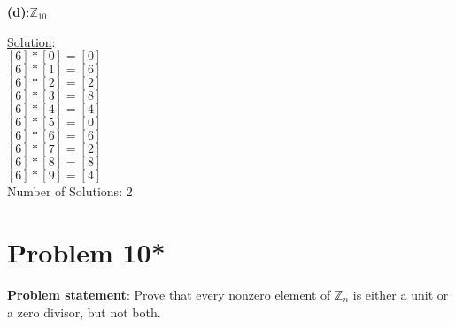 \documentclass{article} %
\begin{document}
\begin{addmargin}[1em]{0em}
\newpage
\textbf{(d)}:$\mathbb{Z}_{10}$
\begin{addmargin}[1em]{0em}
\underline{Solution}: \\
$[6] * [0] = [0]$ \\
$[6] * [1] = [6]$ \\
$[6] * [2] = [2]$ \\
$[6] * [3] = [8]$ \\
$[6] * [4] = [4]$ \\
$[6] * [5] = [0]$ \\
$[6] * [6] = [6]$ \\
$[6] * [7] = [2]$ \\
$[6] * [8] = [8]$ \\
$[6] * [9] = [4]$ \\
Number of Solutions: 2
\begin{addmargin}[1em]{0em}
\end{addmargin}
\end{addmargin}
\end{addmargin}

\newpage

\section*{Problem 10*}

\textbf{Problem statement}: Prove that every nonzero element of $\mathbb{Z}_n$ is either a unit or a zero divisor, but not both.
\\
\end{document}

